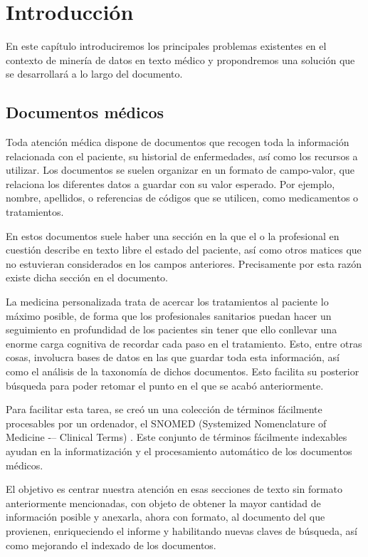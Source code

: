 \chapter{Introducción}

En este capítulo introduciremos los principales problemas existentes en el contexto de minería de datos en texto médico y propondremos una solución que se desarrollará a lo largo del documento.

\section{Documentos médicos}

Toda atención médica dispone de documentos que recogen toda la información relacionada con el paciente, su historial de enfermedades, así como los recursos a utilizar. Los documentos se suelen organizar en un formato de campo-valor, que relaciona los diferentes datos a guardar con su valor esperado. Por ejemplo, nombre, apellidos, o referencias de códigos que se utilicen, como medicamentos o tratamientos.

En estos documentos suele haber una sección en la que el o la profesional en cuestión describe en texto libre el estado del paciente, así como otros matices que no estuvieran considerados en los campos anteriores. Precisamente por esta razón existe dicha sección en el documento.

La medicina personalizada trata de acercar los tratamientos al paciente lo máximo posible, de forma que los profesionales sanitarios puedan hacer un seguimiento en profundidad de los pacientes sin tener que ello conllevar una enorme carga cognitiva de recordar cada paso en el tratamiento. Esto, entre otras cosas, involucra bases de datos en las que guardar toda esta información, así como el análisis de la taxonomía de dichos documentos. Esto facilita su posterior búsqueda para poder retomar el punto en el que se acabó anteriormente.

Para facilitar esta tarea, se creó un una colección de términos fácilmente procesables por un ordenador, el SNOMED (Systemized Nomenclature of Medicine -– Clinical Terms) \cite{snomed}. Este conjunto de términos fácilmente indexables ayudan en la informatización y el procesamiento automático de los documentos médicos.

El objetivo es centrar nuestra atención en esas secciones de texto sin formato anteriormente mencionadas, con objeto de obtener la mayor cantidad de información posible y anexarla, ahora con formato, al documento del que provienen, enriqueciendo el informe y habilitando nuevas claves de búsqueda, así como mejorando el indexado de los documentos.


